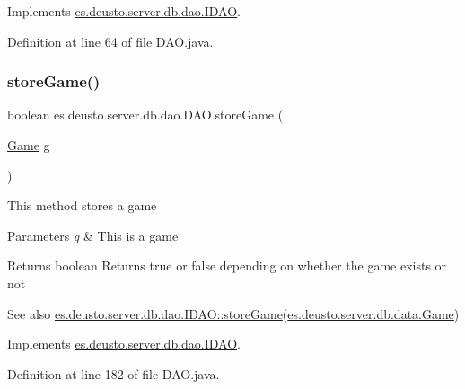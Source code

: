 Implements \hyperlink{interfacees_1_1deusto_1_1server_1_1db_1_1dao_1_1_i_d_a_o_a19f9b0d0b6f5f80730d6d197deca7dfc}{es.\+deusto.\+server.\+db.\+dao.\+I\+D\+AO}.



Definition at line 64 of file D\+A\+O.\+java.

\mbox{\label{classes_1_1deusto_1_1server_1_1db_1_1dao_1_1_d_a_o_a7484309d9b9b39c24cd7d0413a90c468}} 
\subsubsection{\texorpdfstring{store\+Game()}{storeGame()}}
{\footnotesize\ttfamily boolean es.\+deusto.\+server.\+db.\+dao.\+D\+A\+O.\+store\+Game (\begin{DoxyParamCaption}\item[{\hyperlink{classes_1_1deusto_1_1server_1_1db_1_1data_1_1_game}{Game}}]{g }\end{DoxyParamCaption})}

This method stores a game 
\begin{DoxyParams}{Parameters}
{\em g} & This is a game \\
\hline
\end{DoxyParams}
\begin{DoxyReturn}{Returns}
boolean Returns true or false depending on whether the game exists or not 
\end{DoxyReturn}
\begin{DoxySeeAlso}{See also}
\hyperlink{interfacees_1_1deusto_1_1server_1_1db_1_1dao_1_1_i_d_a_o_ab38972c7c70c95b4c409fa7758ef2fc3}{es.\+deusto.\+server.\+db.\+dao.\+I\+D\+A\+O\+::store\+Game}(\hyperlink{classes_1_1deusto_1_1server_1_1db_1_1data_1_1_game}{es.\+deusto.\+server.\+db.\+data.\+Game}) 
\end{DoxySeeAlso}


Implements \hyperlink{interfacees_1_1deusto_1_1server_1_1db_1_1dao_1_1_i_d_a_o_ab38972c7c70c95b4c409fa7758ef2fc3}{es.\+deusto.\+server.\+db.\+dao.\+I\+D\+AO}.



Definition at line 182 of file D\+A\+O.\+java.

\mbox{\label{classes_1_1deusto_1_1server_1_1db_1_1dao_1_1_d_a_o_acb146e96959c340ef828ef8e36b4283c}} 
